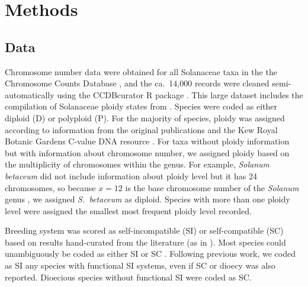 \section{Methods}

\subsection{Data}

Chromosome number data were obtained for all Solanaceae taxa in the the Chromosome Counts Database \citep[CCDB;][]{rice_2015}, and the ca.\ 14,000 records were cleaned semi-automatically using the CCDBcurator R package \citep{zenilferguson_2017}.
This large dataset includes the compilation of Solanaceae ploidy states from \citep{robertson_2011}.
Species were coded as either diploid (D) or polyploid (P).
For the majority of species, ploidy was assigned according to information from the original publications and the Kew Royal Botanic Gardens C-value DNA resource \citep{bennett_2005}.
For taxa without ploidy information but with information about chromosome number, we assigned ploidy based on the multiplicity of chromosomes within the genus.
For example, \textit{Solanum betaceum} did not include information about ploidy level but it has 24 chromosomes, so because $x=12$ is the base chromosome number of the \textit{Solanum} genus \citep{olmstead_2007}, we assigned \textit{S.~betaceum} as diploid. 
Species with more than one ploidy level were assigned the smallest most frequent ploidy level recorded. %

Breeding system was scored as self-incompatible (SI) or self-compatible (SC) based on results hand-curated from the literature (as in \citealt{igic_2006, goldberg_2010, robertson_2011, goldberg_2012}).
Most species could unambiguously be coded as either SI or SC \citep{raduski_2012}.
Following previous work, we coded as SI any species with functional SI systems, even if SC or dioecy was also reported.
Dioecious species without functional SI were coded as SC.

